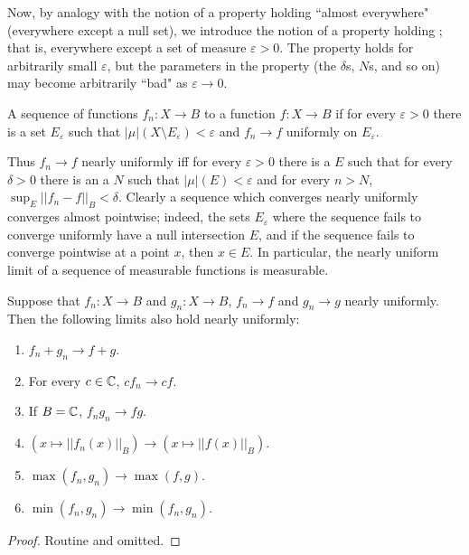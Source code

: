 \begin{subsec}
Now, by analogy with the notion of a property holding ``almost everywhere" (everywhere except a null set), we introduce the notion of a property holding ; that is, everywhere except a set of measure $\varepsilon > 0$. The property holds for arbitrarily small $\varepsilon$, but the parameters in the property (the $\delta$s, $N$s, and so on) may become arbitrarily ``bad" as $\varepsilon \to 0$.
\end{subsec}

\begin{definition}
A sequence of functions $f_{n}: X \to B$  to a function $f: X \to B$ if for every $\varepsilon > 0$ there is a set $E_\varepsilon$ such that $|\mu|(X \setminus E_\varepsilon) < \varepsilon$ and $f_{n} \to f$ uniformly on $E_\varepsilon$.
\end{definition}

\begin{subsec}
Thus $f_{n} \to f$ nearly uniformly iff for every $\varepsilon > 0$ there is a $E$ such that for every $\delta > 0$ there is an a $N$ such that $|\mu|(E) < \varepsilon$ and for every $n > N$, $\sup_{E} ||f_{n} - f||_{B} < \delta$.
Clearly a sequence which converges nearly uniformly converges almost pointwise; indeed, the sets $E_\varepsilon$ where the sequence fails to converge uniformly have a null intersection $E$, and if the sequence fails to converge pointwise at a point $x$, then $x \in E$.
In particular, the nearly uniform limit of a sequence of measurable functions is measurable.
\end{subsec}

\begin{lemma}
Suppose that $f_{n}: X \to B$ and $g_{n}: X \to B$, $f_{n} \to f$ and $g_{n} \to g$ nearly uniformly. Then the following limits also hold nearly uniformly:
\begin{enumerate}
\item $f_{n} + g_{n} \to f + g$.
\item For every $c \in \mathbb{C}$, $cf_{n} \to cf$.
\item If $B = \mathbb{C}$, $f_{n}g_{n} \to fg$.
\item $(x \mapsto ||f_{n}(x)||_B) \to (x \mapsto ||f(x)||_B)$.
\item $\max(f_{n}, g_{n}) \to \max(f, g)$.
\item $\min(f_{n}, g_{n}) \to \min(f_{n}, g_{n})$.
\end{enumerate}
\end{lemma}
\begin{proof}
Routine and omitted.
\end{proof}

